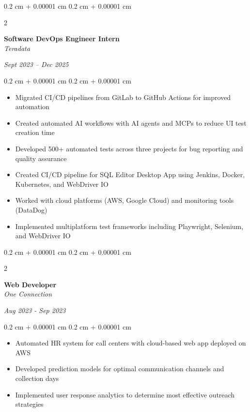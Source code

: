 \documentclass[10pt, letterpaper]{article}
\newenvironment{onecolentry}{
    \begin{adjustwidth}{
        0.2 cm + 0.00001 cm
    }{
        0.2 cm + 0.00001 cm
    }
}{
    \end{adjustwidth}
} %
\newenvironment{twocolentry}[2][]{
    \onecolentry
    \def\secondColumn{#2}
    \setcolumnwidth{\fill, 4.5 cm}
    \begin{paracol}{2}
}{
    \switchcolumn \raggedleft \secondColumn
    \end{paracol}
    \endonecolentry
} %
\begin{document}
    \vspace{0.2 cm}
    \begin{twocolentry}{
    \textit{Sept 2023 – Dec 2025}}
        \textbf{Software DevOps Engineer Intern} \\
        \textit{Teradata}
    \end{twocolentry}
    \begin{onecolentry}
        \begin{itemize}
            \item Migrated CI/CD pipelines from GitLab to GitHub Actions for improved automation
            \item Created automated AI workflows with AI agents and MCPs to reduce UI test creation time
            \item Developed 500+ automated tests across three projects for bug reporting and quality assurance
            \item Created CI/CD pipeline for SQL Editor Desktop App using Jenkins, Docker, Kubernetes, and WebDriver IO
            \item Worked with cloud platforms (AWS, Google Cloud) and monitoring tools (DataDog)
            \item Implemented multiplatform test frameworks including Playwright, Selenium, and WebDriver IO
        \end{itemize}
    \end{onecolentry}
    \vspace{0.2 cm}
    \begin{twocolentry}{
    \textit{Aug 2023 - Sep 2023}}
        \textbf{Web Developer} \\
        \textit{One Connection}
    \end{twocolentry}
    \begin{onecolentry}
        \begin{itemize}
            \item Automated HR system for call centers with cloud-based web app deployed on AWS
            \item Developed prediction models for optimal communication channels and collection days
            \item Implemented user response analytics to determine most effective outreach strategies
        \end{itemize}
    \end{onecolentry}
    
\end{document}
